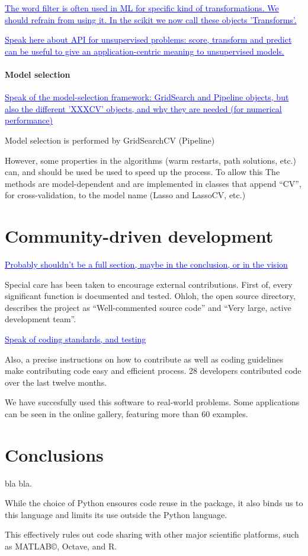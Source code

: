 \documentclass[twoside,11pt]{article}
\newcommand{\GAEL}[1]{\textcolor{blue}{\uline{#1}}}
\begin{document}
\GAEL{The word filter is often used in ML for specific kind of
transformations. We should refrain from using it. In the scikit we now
call these objects 'Transforms'. }

\GAEL{Speak here about API for unsupervised problems: score, transform and
predict can be useful to give an application-centric meaning to
unsupervised models.}

\paragraph{Model selection}

\GAEL{Speak of the model-selection framework: GridSearch and Pipeline
objects, but also the different 'XXXCV' objects, and why they are needed
(for numerical performance)}

Model selection is performed by GridSearchCV (Pipeline)

However, some properties in the algorithms (warm restarts, path
solutions, etc.) can, and should be used be used to speed up the
process. To allow this The methods are model-dependent and are
implemented in classes that append ``CV'', for cross-validation, to
the model name (Lasso and LassoCV, etc.)


\section{Community-driven development}

\GAEL{Probably shouldn't be a full section, maybe in the conclusion, or
in the vision}

Special care has been taken to encourage external contributions. First
of, every significant function is documented and tested.  Ohloh, the
open source directory, describes the project as ``Well-commented
source code'' and ``Very large, active development team''.

\GAEL{Speak of coding standards, and testing} 

Also, a precise instructions on how to contribute as well as coding
guidelines make contributing code easy and efficient process. 28
developers contributed code over the last twelve months.

We have succesfully used this software to real-world problems. Some
applications can be seen in the online gallery, featuring more than 60
examples.



\section{Conclusions}

bla bla.

While the choice of Python ensoures code reuse in the package, it also
binds us to this language and limits its use outside the Python
language.

This effectively rules out code sharing with other major scientific
platforms, such as MATLAB©, Octave, and R.
\end{document}
